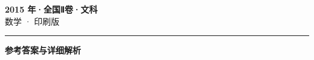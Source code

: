 \documentclass[zihao=5, a4paper]{ctexart}
\begin{document}
\begin{center}
  {\Large\bfseries 2015 年·全国Ⅱ卷·文科}\\[4pt]
  {\large 数学 · 印刷版}
\end{center}
\medskip
{}

\par\bigskip\hrule\bigskip
{}
\begin{center}{\large\bfseries 参考答案与详细解析}\end{center}
\smallskip

\end{document}
